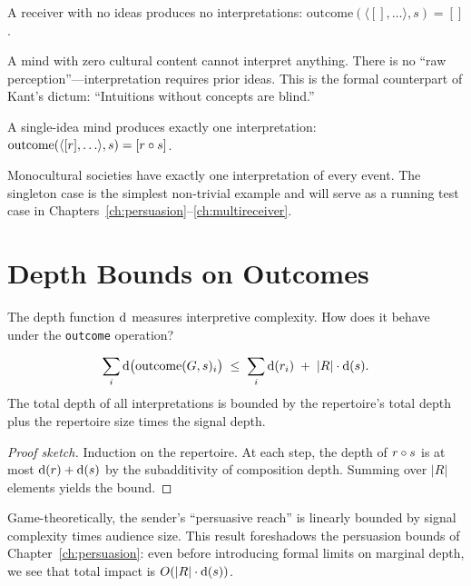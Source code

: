 \begin{theorem}
\label{thm:empty-repertoire-outcome}
A receiver with no ideas produces no interpretations:
$\mathrm{outcome}(\langle [], \ldots\rangle, s) = []$.
\end{theorem}

A mind with zero cultural content cannot interpret anything.  There is no
``raw perception''---interpretation requires prior ideas.  This is the
formal counterpart of Kant's dictum: ``Intuitions without concepts are
blind.''

\begin{theorem}
\label{thm:singleton-outcome}
A single-idea mind produces exactly one interpretation:
$\mathrm{outcome}(\langle [r], \ldots\rangle, s) = [r\circ s]$.
\end{theorem}

Monocultural societies have exactly one interpretation of every event.
The singleton case is the simplest non-trivial example and will serve as
a running test case in Chapters~\ref{ch:persuasion}--\ref{ch:multireceiver}.


\section{Depth Bounds on Outcomes}
\label{sec:eq-depth}

The depth function $\operatorname{d}$ measures interpretive complexity.  How does it
behave under the \texttt{outcome} operation?

\begin{theorem}
\label{thm:outcome-depth-bound}
\[
  \sum_{i} \operatorname{d}\bigl(\mathrm{outcome}(G,s)_i\bigr)
  \;\le\;
  \sum_{i} \operatorname{d}(r_i) \;+\; |R|\cdot\operatorname{d}(s).
\]
The total depth of all interpretations is bounded by the repertoire's total
depth plus the repertoire size times the signal depth.
\end{theorem}

\begin{proof}[Proof sketch]
Induction on the repertoire.  At each step, the depth of $r\circ s$ is
at most $\operatorname{d}(r) + \operatorname{d}(s)$ by the subadditivity of composition depth.
Summing over $|R|$ elements yields the bound.
\end{proof}

Game-theoretically, the sender's ``persuasive reach'' is linearly bounded
by signal complexity times audience size.  This result foreshadows the
persuasion bounds of Chapter~\ref{ch:persuasion}: even before introducing
formal limits on marginal depth, we see that total impact is $O(|R|\cdot\operatorname{d}(s))$.

